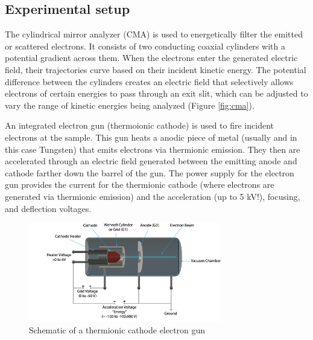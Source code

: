 \documentclass[12pt]{article}
\begin{document}

\subsection{Experimental setup}

The cylindrical mirror analyzer (CMA) is used to energetically filter the emitted or scattered electrons. It consists of two conducting coaxial cylinders with a potential gradient across them. When the electrons enter the generated electric field, their trajectories curve based on their incident kinetic energy. The potential difference between the cylinders creates an electric field that selectively allows electrons of certain energies to pass through an exit slit, which can be adjusted to vary the range of kinetic energies being analyzed (Figure \ref{fig:cma}).

An integrated electron gun (thermoionic cathode) is used to fire incident electrons at the sample. This gun heats a anodic piece of metal (usually and in this case Tungsten) that emits electrons via thermionic emission. They then are accelerated through an electric field generated between the emitting anode and cathode farther down the barrel of the gun. The power supply for the electron gun provides the current for the thermionic cathode (where electrons are generated via thermionic emission) and the acceleration (up to 5 kV!), focusing, and deflection voltages.


\begin{figure}[!h]
    \centering
    \includegraphics[width=0.75\textwidth]{Electron_Gun_simple_schematic_20190402v1-crop-u11694.png} %
     \caption{Schematic of a thermionic cathode electron gun \cite{jeol2012thermionic}}
    \label{fig:example}
\end{figure}
\end{document}
